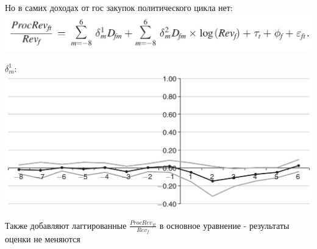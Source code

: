 \begin{frame}
Но в самих доходах от гос закупок политического цикла нет:
\includegraphics[scale=0.3]{images/tunnelling_from_procurement2}\\
\vspace{3mm}

$\delta^1_m$:\\
\includegraphics[scale=0.25]{images/tunnelling_from_procurement3}
\vspace{3mm}

Также добавляют лаггированные $\frac{ProcRev_{ft}}{Rev_f}$ в основное уравнение - результаты оценки не меняются
\end{frame}